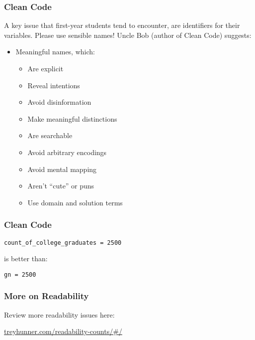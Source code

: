 \begin{frame}[fragile]
	\frametitle{Clean Code}
		
	A key issue that first-year students tend to encounter, are identifiers for their variables. Please use sensible names! Uncle Bob (author of Clean Code) suggests:
	
	\begin{itemize}
		\item Meaningful names, which:
		\begin{itemize}
			\item Are explicit
			\item Reveal intentions
			\item Avoid disinformation
			\item Make meaningful distinctions
			\item Are searchable
			\item Avoid arbitrary encodings
			\item Avoid mental mapping
			\item Aren't ``cute'' or puns
			\item Use domain and solution terms
		\end{itemize}	
	\end{itemize}
	
\end{frame}

\begin{frame}[fragile]
	\frametitle{Clean Code}
		
	\begin{lstlisting}
count_of_college_graduates = 2500
	\end{lstlisting}	

\vspace{2em}

is better than:

\vspace{2em}

	\begin{lstlisting}
gn = 2500
	\end{lstlisting}	

\end{frame}

\begin{frame}[fragile]
	\frametitle{More on Readability}
		
	Review more readability issues here: 
	
	\vspace{2em}
	
	\url{treyhunner.com/readability-counts/#/}
	
\end{frame}
